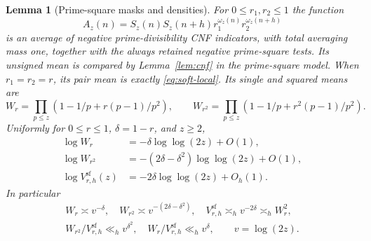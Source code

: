 \documentclass[11pt]{article}
\newtheorem{lemma}[theorem]{Lemma}
\theoremstyle{definition}
\theoremstyle{remark}
\numberwithin{equation}{section}
\newcommand{\sfw}{\mathrm{sf}}
\begin{document}
\begin{lemma}[Prime-square masks and densities]\label{lem:soft-density}
For $0\le r_1,r_2\le1$ the function
\begin{equation}\label{eq:two-soft-mask}
 A_z(n)=S_z(n)S_z(n+h)r_1^{\omega_z(n)}r_2^{\omega_z(n+h)}
\end{equation}
is an average of negative prime-divisibility CNF indicators, with total averaging mass one, together with the
always retained negative prime-square tests. Its unsigned mean is compared by Lemma~\ref{lem:cnf} in the prime-square
model. When $r_1=r_2=r$, its pair mean is exactly \eqref{eq:soft-local}. Its single and squared means are
\begin{equation}\label{eq:soft-single-products}
 W_r=\prod_{p\le z}(1-1/p+r(p-1)/p^2),\qquad
 W_{r^2}=\prod_{p\le z}(1-1/p+r^2(p-1)/p^2).
\end{equation}
Uniformly for $0\le r\le1$, $\delta=1-r$, and $z\ge2$,
\begin{align}
 \log W_r&=-\delta\log\log(2z)+O(1),\label{eq:soft-log-first}\\
 \log W_{r^2}&=-(2\delta-\delta^2)\log\log(2z)+O(1),\label{eq:soft-log-square}\\
 \log V^{\sfw}_{r,h}(z)&=-2\delta\log\log(2z)+O_h(1).\label{eq:soft-log-pair}
\end{align}
In particular
\begin{equation}\label{eq:soft-density-ratios}
\begin{gathered}
 W_r\asymp v^{-\delta},\quad W_{r^2}\asymp v^{-(2\delta-\delta^2)},\quad
 V^{\sfw}_{r,h}\asymp_h v^{-2\delta}\asymp_h W_r^2,\\
 W_{r^2}/V^{\sfw}_{r,h}\ll_h v^{\delta^2},\quad W_r/V^{\sfw}_{r,h}\ll_h v^\delta,
 \qquad v=\log(2z).
\end{gathered}
\end{equation}
\end{lemma}
\end{document}
